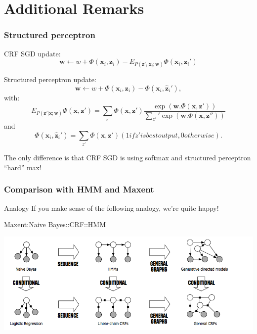 \documentclass[usenames,dvipsnames]{beamer}
\newcommand{\x}{\mathbf{x}}
\newcommand{\w}{\mathbf{w}}
\newcommand{\z}{\mathbf{z}}
\begin{document}
\section{Additional Remarks}

\begin{frame}\frametitle{Structured perceptron}

CRF SGD update:
\begin{equation*}
 \w \leftarrow w + \Phi(\x_i,\z_i)- E_{P(\z'_i|\x_i;\w)} \Phi(\x_i,\z_i')
\end{equation*}

\vspace{0.4cm}
Structured perceptron update:
\begin{equation*}
 \w \leftarrow w + \Phi(\x_i,\z_i)- \Phi(\x_i,\hat{\z}_i'),
\end{equation*}
with:
\vspace{0.4cm}
\begin{equation*}
E_{P(\z'|\x;\w)} \Phi(\x,\z') = \sum_{z'} \Phi(\x,\z') \frac{\exp(\w . \Phi(\x,\z'))}{\sum_{z'}' \exp(\w. \Phi(\x,\z''))} 
\end{equation*}
and
\begin{equation*}
\Phi(\x_i,\hat{\z}_i') = \sum_{z'} \Phi(\x,\z') (1 if z' is best output, 0 otherwise).
\end{equation*}

\vspace{0.4cm}
The only difference is that CRF SGD is using softmax and structured
perceptron ``hard'' max!
\end{frame}


\begin{frame}\frametitle{Comparison with HMM and Maxent}

\begin{block}{Analogy}
If you make sense of the following analogy, we're quite happy!
\begin{center}
  Maxent:Naive Bayes::CRF::HMM
\end{center}
\end{block}

\pause
\begin{center}
\includegraphics[scale=0.4]{crfanalogy}
\end{center}

\end{frame}
\end{document}
